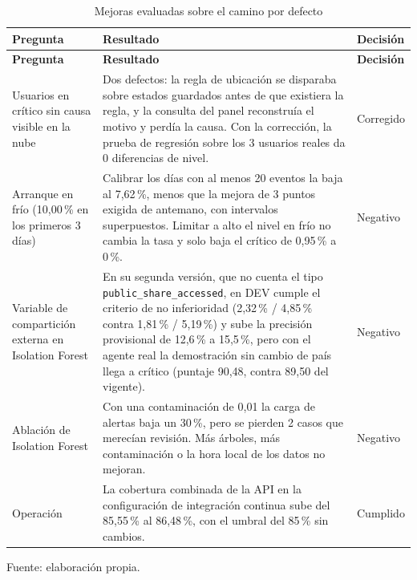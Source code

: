 \begin{longtable}{>{\raggedright\arraybackslash}p{3.0cm}>{\raggedright\arraybackslash}p{8.6cm}>{\raggedright\arraybackslash}p{2.2cm}}
	\caption{Mejoras evaluadas sobre el camino por defecto}
	\label{tab:mejora-modelos}\\
	\hline
	\textbf{Pregunta} & \textbf{Resultado} & \textbf{Decisión} \\
	\hline
	\endfirsthead
	\hline
	\textbf{Pregunta} & \textbf{Resultado} & \textbf{Decisión} \\
	\hline
	\endhead
	Usuarios en crítico sin causa visible en la nube & Dos defectos: la regla de ubicación se disparaba sobre estados guardados antes de que existiera la regla, y la consulta del panel reconstruía el motivo y perdía la causa. Con la corrección, la prueba de regresión sobre los 3 usuarios reales da 0 diferencias de nivel. & Corregido \\
	\hline
	Arranque en frío (10,00\,\% en los primeros 3 días) & Calibrar los días con al menos 20 eventos la baja al 7,62\,\%, menos que la mejora de 3 puntos exigida de antemano, con intervalos superpuestos. Limitar a alto el nivel en frío no cambia la tasa y solo baja el crítico de 0,95\,\% a 0\,\%. & Negativo \\
	\hline
	Variable de compartición externa en Isolation Forest & En su segunda versión, que no cuenta el tipo \texttt{public\_\allowbreak{}share\_\allowbreak{}accessed}, en DEV cumple el criterio de no inferioridad (2,32\,\% / 4,85\,\% contra 1,81\,\% / 5,19\,\%) y sube la precisión provisional de 12,6\,\% a 15,5\,\%, pero con el agente real la demostración sin cambio de país llega a crítico (puntaje 90,48, contra 89,50 del vigente). & Negativo \\
	\hline
	Ablación de Isolation Forest & Con una contaminación de 0,01 la carga de alertas baja un 30\,\%, pero se pierden 2 casos que merecían revisión. Más árboles, más contaminación o la hora local de los datos no mejoran. & Negativo \\
	\hline
	Operación & La cobertura combinada de la API en la configuración de integración continua sube del 85,55\,\% al 86,48\,\%, con el umbral del 85\,\% sin cambios. & Cumplido \\
	\hline
\end{longtable}
{\small Fuente: elaboración propia.\par}

